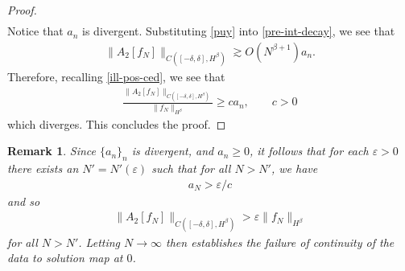 \documentclass[12pt,reqno]{amsart}
\numberwithin{equation}{section}  %
\newcommand{\ee}{\varepsilon}
\newtheorem{remark}[theorem]{Remark}
\begin{document}
\begin{proof}
\begin{equation*}
\begin{split}
\end{split}
\end{equation*}
%
%
Notice that $a_{n}$ is divergent. Substituting \eqref{puy} into \eqref{pre-int-decay}, we see that 
%
%
\begin{equation*}
\begin{split}
\|A_{2}[f_{N}]\|_{C( [-\delta, \delta], H^{\beta})}
   \gtrsim O(N^{\beta+1}) a_{n}.
\end{split}
\end{equation*}
%
Therefore, recalling \eqref{ill-pos-ced}, we see that
%
%
\begin{equation*}
\begin{split}
\frac{\|A_{2}[f_{N}]\|_{C( [-\delta, \delta], H^{\beta})}}{\| f_{N}
\|_{H^{\beta}}} \ge c a_{n}, \qquad c > 0 
\end{split}
\end{equation*}
%
%
which diverges. This concludes the proof.
%
%
%
%
%
\end{proof}
%
%
\begin{framed}
\begin{remark}
 Since $\{a_{n}\}_{n}$ is divergent, and $a_{n} \ge 0$, it follows that for each $\ee > 0$ there exists an $N' = N'(\ee)$ such that for all $N > N'$, we have
  \begin{equation*}
  \begin{split}
    a_{N} > \ee/c
  \end{split}
  \end{equation*}
  and so
  \begin{equation*}
  \begin{split}
  \|A_{2}[f_{N}]\|_{C( [-\delta, \delta], H^{\beta})}
  > \ee {\| f_{N} \|_{H^{\beta}}}
  \end{split}
  \end{equation*}
  for all $N > N'$. Letting $N \to \infty$ then establishes the failure of continuity of the data to solution map at $0$.  
\label{rem:calc}
\end{remark}
\end{framed}
%
%
%
%
%
%
%
%
%
%
%
%
\end{document}
